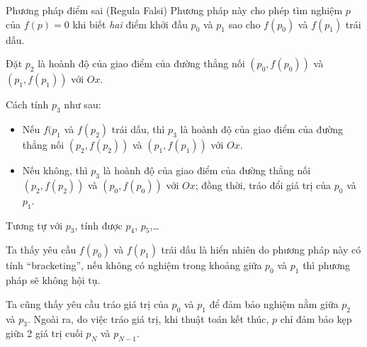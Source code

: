 \documentclass[../../Lectures]{subfiles}
\begin{document}
\begin{cmethod}{Phương pháp điểm sai (Regula Falsi)}{}
    Phương pháp này cho phép tìm nghiệm \(p\) của \(f(p) = 0\) khi biết
    \emph{hai} điểm khởi đầu \(p_0\) và \(p_1\) sao cho \(f(p_0)\) và \(f(p_1)\)
    trái dấu.

    Đặt \(p_2\) là hoành độ của giao điểm của đường thẳng nối \((p_0, f(p_0))\)
    và \((p_1, f(p_1))\) với \(Ox\).

    Cách tính \(p_3\) như sau:

    \begin{itemize}
        \item Nếu \(f(p_1\) và \(f(p_2)\) trái dấu, thì \(p_3\) là hoành độ của
            giao điểm của đường thẳng nối \((p_2, f(p_2))\) và \((p_1, f(p_1))\)
            với \(Ox\).

        \item Nếu không, thì \(p_3\) là hoành độ của giao điểm của đường thẳng
            nối \((p_2, f(p_2))\) và \((p_0, f(p_0))\)  với \(Ox\); đồng thời,
            tráo đổi giá trị của \(p_0\) và \(p_1\).
    \end{itemize}

    Tương tự với \(p_3\), tính được \(p_4\), \(p_5\),\ldots
\end{cmethod}

Ta thấy yêu cầu \(f(p_0)\) và \(f(p_1)\) trái dấu là hiển nhiên do phương pháp
này có tính ``bracketing'', nếu không có nghiệm trong khoảng giữa \(p_0\) và
\(p_1\) thì phương pháp sẽ không hội tụ.

Ta cũng thấy yêu cầu tráo giá trị của \(p_0\) và \(p_1\) để đảm bảo nghiệm nằm
giữa \(p_2\) và \(p_3\). Ngoài ra, do việc tráo giá trị, khi thuật toán kết
thúc, \(p\) chỉ đảm bảo kẹp giữa 2 giá trị cuối \(p_N\) và \(p_{N - 1}\).
\end{document}
